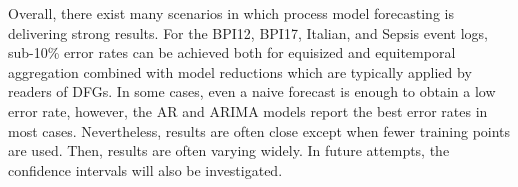 Overall, there exist many scenarios in which process model forecasting is delivering strong results.
For the BPI12, BPI17, Italian, and Sepsis event logs, sub-10\% error rates can be achieved both for equisized and equitemporal aggregation combined with model reductions which are typically applied by readers of DFGs.
In some cases, even a naive forecast is enough to obtain a low error rate, however, the AR and ARIMA models report the best error rates in most cases.
Nevertheless, results are often close except when fewer training points are used.
Then, results are often varying widely.
In future attempts, the confidence intervals will also be investigated.











